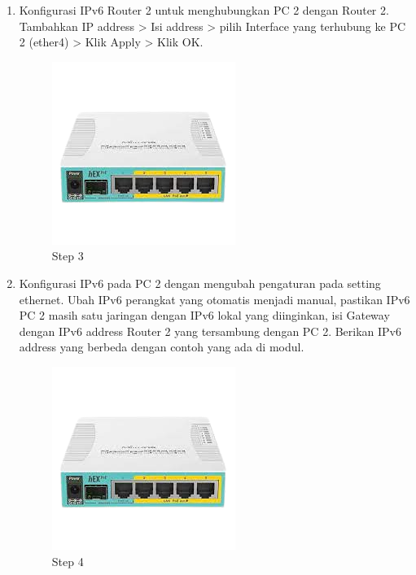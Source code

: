\begin{enumerate}
	\item Konfigurasi IPv6 Router 2 untuk menghubungkan PC 2 dengan Router 2. Tambahkan IP address
	> Isi address > pilih Interface yang terhubung ke PC 2 (ether4) > Klik Apply > Klik OK.
	
	\begin{figure}[H]
		\centering
		\includegraphics[width=0.7\linewidth]{P1/img/contoh.png}
		\caption{Step 3}
		\label{fig:gambar1}
	\end{figure}

	\item Konfigurasi IPv6 pada PC 2 dengan mengubah pengaturan pada setting ethernet. Ubah IPv6
	perangkat yang otomatis menjadi manual, pastikan IPv6 PC 2 masih satu jaringan dengan IPv6
	lokal yang diinginkan, isi Gateway dengan IPv6 address Router 2 yang tersambung dengan PC
	2. Berikan IPv6 address yang berbeda dengan contoh yang ada di modul.
	
	\begin{figure}[H]
		\centering
		\includegraphics[width=0.7\linewidth]{P1/img/contoh.png}
		\caption{Step 4}
		\label{fig:gambar1}
	\end{figure}


\end{enumerate}
